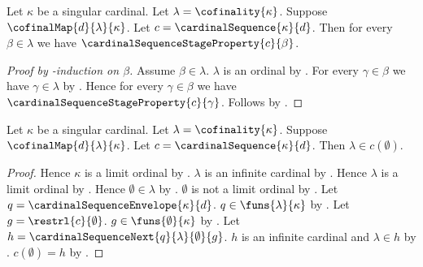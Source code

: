 \begin{theorem}\label{cardinal_sequence_stage_properties}
    Let $\kappa$ be a singular cardinal.
    Let $\lambda=\cofinality{\kappa}$.
    Suppose $\cofinalMap{d}{\lambda}{\kappa}$.
    Let $c=\cardinalSequence{\kappa}{d}$.
    Then for every $\beta\in\lambda$ we have
        $\cardinalSequenceStageProperty{c}{\beta}$.
\end{theorem}
\begin{proof}[Proof by \in-induction on $\beta$]
    Assume $\beta\in\lambda$.
    $\lambda$ is an ordinal
        by .
    For every $\gamma\in\beta$ we have $\gamma\in\lambda$
        by .
    Hence for every $\gamma\in\beta$ we have
        $\cardinalSequenceStageProperty{c}{\gamma}$.
    Follows by .
\end{proof}

\begin{proposition}\label{cardinal_sequence_contains_cofinality_at_zero}
    Let $\kappa$ be a singular cardinal.
    Let $\lambda=\cofinality{\kappa}$.
    Suppose $\cofinalMap{d}{\lambda}{\kappa}$.
    Let $c=\cardinalSequence{\kappa}{d}$.
    Then $\lambda\in c(\emptyset)$.
\end{proposition}
\begin{proof}
    Hence $\kappa$ is a limit ordinal
        by .
    $\lambda$ is an infinite cardinal
        by .
    Hence $\lambda$ is a limit ordinal
        by .
    Hence $\emptyset\in\lambda$ by .
    $\emptyset$ is not a limit ordinal by .
    Let $q=\cardinalSequenceEnvelope{\kappa}{d}$.
    $q\in\funs{\lambda}{\kappa}$
        by .
    Let $g=\restrl{c}{\emptyset}$.
    $g\in\funs{\emptyset}{\kappa}$
        by .
    Let $h=\cardinalSequenceNext{q}{\lambda}{\emptyset}{g}$.
    $h$ is an infinite cardinal and $\lambda\in h$
        by .
    $c(\emptyset)=h$ by .
\end{proof}

